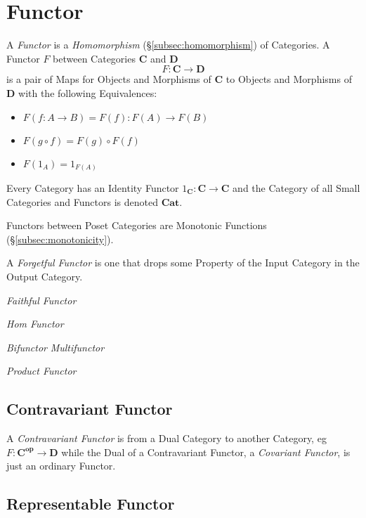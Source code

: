 \section{Functor}\label{sec:category_functor}

A \emph{Functor} is a \emph{Homomorphism}
(\S\ref{subsec:homomorphism}) of Categories. A Functor $F$ between
Categories $\mathbf{C}$ and $\mathbf{D}$
\[
    F : \mathbf{C} \rightarrow \mathbf{D}
\]
is a pair of Maps for Objects and Morphisms of $\mathbf{C}$ to Objects
and Morphisms of $\mathbf{D}$ with the following Equivalences:
\begin{itemize}
\item $F(f : A \rightarrow B) = F(f) : F(A) \rightarrow F(B)$
\item $F(g \circ f) = F(g) \circ F(f)$
\item $F(1_A) = 1_{F(A)}$
\end{itemize}
Every Category has an Identity Functor $1_{\mathbf{C}} : \mathbf{C}
\rightarrow \mathbf{C}$ and the Category of all Small Categories and
Functors is denoted $\mathbf{Cat}$.

Functors between Poset Categories are Monotonic Functions
(\S\ref{subsec:monotonicity}).

A \emph{Forgetful Functor} is one that drops some Property of the
Input Category in the Output Category.

\emph{Faithful Functor}

\emph{Hom Functor}

\emph{Bifunctor} \emph{Multifunctor}

\emph{Product Functor}

\subsection{Contravariant Functor}\label{subsec:contravariant_functor}

A \emph{Contravariant Functor} is from a Dual Category to another
Category, eg $F : \mathbf{C^{op}} \rightarrow \mathbf{D}$ while the
Dual of a Contravariant Functor, a \emph{Covariant Functor}, is just
an ordinary Functor.

\subsection{Representable Functor}\label{subsec:representable_functor}


